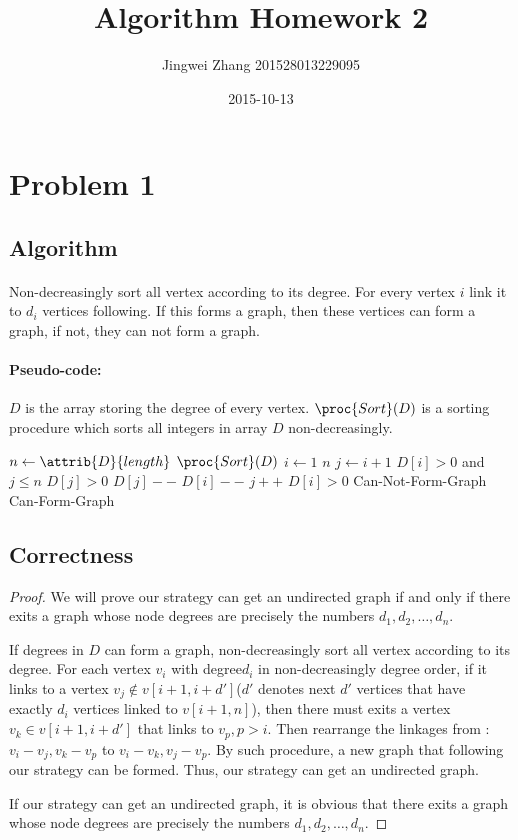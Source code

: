 \documentclass[]{article}
\title{Algorithm Homework 2}
\date{2015-10-13}
\author{Jingwei Zhang 201528013229095}
\begin{document}
    \maketitle
    \section{Problem 1}
        \subsection{Algorithm}
        \paragraph{}Non-decreasingly sort all vertex according to its degree. For every vertex $i$ link it to $d_i$ vertices following. If this forms a graph, then these vertices can form a graph, if not, they can not form a graph.
        \paragraph{Pseudo-code:} $D$ is the array storing the degree of every vertex. $\proc{Sort}(D)$ is a sorting procedure which sorts all integers in array $D$ non-decreasingly.
\begin{codebox}
\li $n \gets \attrib{D}{length}$
\li $\proc{Sort}(D)$ 
\li \For $i \gets 1$ \To $n$ \label{Whether-Form-Graph:for i}
\li     \Do
            $j \gets i+1$
\li         \While $D[i] > 0$ and $j \leq n$ \label{Whether-Form-Graph:for j}
\li             \Do
                    \If $D[j] > 0$
\li                 \Then $D[j]--$
\li                       $D[i]--$
\li                       $j++$
                    \End
                \End
\li         \If $D[i] > 0$
\li         \Then \Return Can-Not-Form-Graph
            \End
        \End
\li \Return Can-Form-Graph
\end{codebox}
        \subsection{Correctness}
        \begin{proof}We will prove our strategy can get an undirected graph if and only if there exits a graph whose node degrees are precisely the numbers $d_1,d_2,\dots,d_n$.
        \item If degrees in $D$ can form a graph, non-decreasingly sort all vertex according to its degree. For each vertex $v_i$ with degree$d_i$ in non-decreasingly degree order, if it links to a vertex $v_j \notin v[i+1,i+d']$($d'$ denotes next $d'$ vertices that have exactly $d_i$ vertices linked to $v[i+1,n]$), then there must exits a vertex $v_k \in v[i+1,i+d']$ that links to $v_p, p > i$. Then rearrange the linkages from :$v_i-v_j,v_k-v_p$ to $v_i-v_k, v_j-v_p$. By such procedure, a new graph that following our strategy can be formed. Thus, our strategy can get an undirected graph.
        \item If our strategy can get an undirected graph, it is obvious that there exits a graph whose node degrees are precisely the numbers $d_1,d_2,\dots,d_n$.
        \end{proof}   
        
\end{document}
